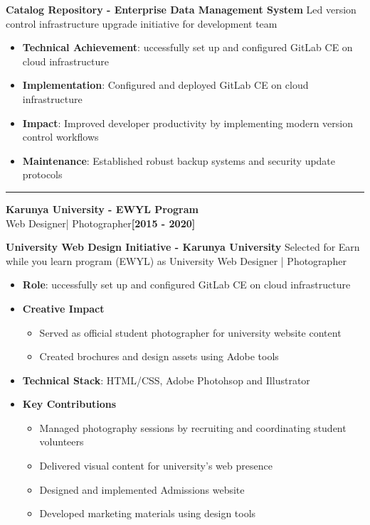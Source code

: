 \documentclass[letterpaper,10pt]{article}
\newcommand{\timelineEntry}[3]{%
	\noindent\color{accent}\large\textbf{#1}\\
	{\color{accent}#2}\hfill\textbf{\color{accent}\small[#3]}
	\newline\newline
}
\newcommand{\texthr}[1]{%
	\vspace{1em}
	\noindent #1 {\color{primary}\leaders\hrule\hfill}%
	\vspace{1em}
}
\begin{document}
\vspace{0.4em}\noindent\large\textbf{Catalog Repository - Enterprise Data Management System}\newline
\noindent Led version control infrastructure upgrade initiative for development team
\begin{itemize}[leftmargin=*, nosep, itemsep=0.4em, before=\vspace{0.6em}, after=\vspace{0.8em}, label={}]
	\item \textbf{Technical Achievement}: uccessfully set up and configured GitLab CE on cloud infrastructure
	\item \textbf{Implementation}: Configured and deployed GitLab CE on cloud infrastructure
	\item \textbf{Impact}: Improved developer productivity by implementing modern version control workflows
	\item \textbf{Maintenance}: Established robust backup systems and security update protocols
\end{itemize}

\texthr{}

\timelineEntry{Karunya University - EWYL Program}{Web Designer| Photographer}{2015 - 2020}
\vspace{0.4em}\noindent\large\textbf{University Web Design Initiative - Karunya University}\newline
\noindent Selected for Earn while you learn program (EWYL)  as University Web Designer | Photographer
\begin{itemize}[leftmargin=*, nosep, itemsep=0.4em, before=\vspace{0.6em}, after=\vspace{0.8em}, label={}]
	\item \textbf{Role}: uccessfully set up and configured GitLab CE on cloud infrastructure
	\item \textbf{Creative Impact}
	\begin{itemize}
		\item Served as official student photographer for university website content
		\item Created brochures and design assets using Adobe tools
	\end{itemize}
	\item \textbf{Technical Stack}: HTML/CSS, Adobe Photohsop and Illustrator
	\item \textbf{Key Contributions}
	\begin{itemize}
		\item Managed photography sessions by recruiting and coordinating student volunteers
		\item Delivered visual content for university's web presence
		\item Designed and implemented Admissions website
		\item Developed marketing materials using design tools
	\end{itemize}
\end{itemize}
\end{document}
